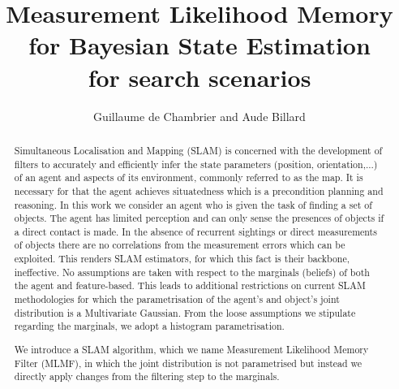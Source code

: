 \documentclass[review]{elsarticle}
\numberwithin{equation}{section}
\begin{document}
\newcommand{\V}{\ensuremath{\mathcal{V}}}
\newcommand{\varOne}{\ensuremath{\sigma_{x}^{2}}}
\newcommand{\varTwo}{\ensuremath{\sigma_{m}^{2}}}
\newcommand{\stdOne}{\ensuremath{\sigma_{x}}}
\newcommand{\stdTwo}{\ensuremath{\sigma_{m}}}
\newcommand\independent{\protect\mathpalette{\protect\independenT}{\perp}}\def\independenT#1#2{\mathrel{\rlap{$#1#2$}\mkern2mu{#1#2}}}
\newcommand{\dependent}{\rotatebox[origin=c]{180}{$\independent$}}

\newcommand{\BigO}[1]{\ensuremath{\operatorname{O}\bigl(#1\bigr)}}


\begin{frontmatter}

\title{Measurement Likelihood Memory for Bayesian State Estimation\\ for search scenarios}

\author{Guillaume de Chambrier and Aude Billard}
\address{Ecole Polytechnique Federale de Lausanne (EPFL), Route Cantonale, 1015 Lausanne, Switzerland}

\begin{abstract}

Simultaneous Localisation and Mapping (SLAM) is concerned with the development of filters to accurately and efficiently infer the state parameters
(position, orientation,...) of an agent and aspects of its environment, commonly referred to as the map. It is necessary for that the agent achieves situatedness 
which is a precondition planning and reasoning. In this work we consider an agent who is given the task of finding a set of objects.
The agent has limited perception and can only sense the presences of objects if a direct contact is made. 
In the absence of recurrent sightings or direct measurements of objects there are no correlations from the measurement errors which 
can be exploited. This renders SLAM estimators, for which this fact is their backbone, ineffective. 
No assumptions are taken with respect to the marginals (beliefs) of both the agent and feature-based.
This leads to additional restrictions on current SLAM methodologies for which the parametrisation of the agent's and object's joint distribution is a Multivariate Gaussian.
From the loose assumptions we stipulate regarding the marginals, we adopt a histogram parametrisation. 

We introduce a SLAM algorithm, which we name Measurement Likelihood Memory Filter (MLMF), in which the joint distribution is not parametrised  
but instead we directly apply changes from the filtering step to the marginals. 


\end{abstract}
\end{frontmatter}
\end{document}
